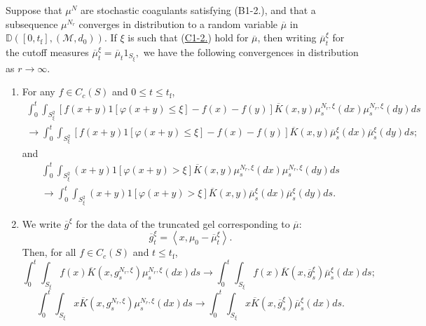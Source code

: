 \begin{lemma}\label{lemma: convergences in distribution}
Suppose that $\mu^N$ are stochastic coagulants satisfying (B1-2.), and that a subsequence  $\mu^{N_r}$ converges in distribution to a random variable $\overline{\mu}$ in $\mathbb{D}([0,t_\mathrm{f}],(\mathcal{M},d_0))$. If $\xi$ is such that (\hyperref[eq: reg]{C1-2.}) hold for $\overline{\mu}$, then writing $\overline{\mu}^\xi_t$ for the cutoff measures $\overline{\mu}^\xi_t=\overline{\mu}_t1_{S_\xi},$ we have the following convergences in distribution as $r\rightarrow \infty$. 
\begin{enumerate}[label=\roman{*}).] \item
For any $f\in C_c(S)$ and $0\le t \le t_\mathrm{f}$,
\begin{multline}
    \int_0^t \int_{S_\xi^2}\left[f(x+y)1[\varphi(x+y) \leq \xi ] - f(x) - f(y)\right]
      \overline{K}(x,y)\mu^{N_r,\xi}_s(d x)\mu^{N_r,\xi}_s(d y)d s
    \\\rightarrow
    \int_0^t \int_{S_\xi^2}\left[f(x+y)1[\varphi(x+y) \leq \xi ] - f(x) - f(y)\right]
      \overline{K}(x,y)\overline{\mu}^\xi_s(d x)\overline{\mu}^\xi_s(d y)d s;
\end{multline}
and
\begin{multline}
    \int_0^t \int_{S_\xi^2}(x+y)1[\varphi(x+y) > \xi ]
      \overline{K}(x,y)\mu^{N_r,\xi}_s(d x)\mu^{N_r,\xi}_s(d y)d s
    \\\rightarrow
    \int_0^t \int_{S_\xi^2}(x+y)1[\varphi(x+y) > \xi ]
      \overline{K}(x,y)\overline{\mu}^\xi_s(d x)\overline{\mu}^\xi_s(d y)d s.
\end{multline}
\item We write $\overline{g}^\xi$ for the data of the truncated gel corresponding to $\overline{\mu}$: \begin{equation}\label{eq: cutoff gel overline g xi} \overline{g}^{\xi}_t = \left<x, \mu_0 -\overline{\mu}^\xi_t\right>.\end{equation}   Then, for all $f\in C_c(S)$ and $t\le t_\mathrm{f}$, \begin{equation*}
    \int_0^t \int_{S_\xi}f(x) \overline{K}(x,g^{N_r,\xi}_s)\mu^{N_r,\xi}_s(d x)d s
    \rightarrow
    \int_0^t \int_{S_\xi}f(x) \overline{K}(x,\overline{g}^\xi_s)\overline{\mu}^\xi_s(d x)d s;
\end{equation*}
\begin{equation*}
    \int_0^t \int_{S_\xi}x \overline{K}(x,g^{N_r,\xi}_s)\mu^{N_r,\xi}_s(d x)d s \rightarrow \int_0^t \int_{S_\xi}x \overline{K}(x,\overline{g}^\xi_s)\overline{\mu}^\xi_s(d x)d s.

\end{equation*}
\end{enumerate}
\end{lemma}
